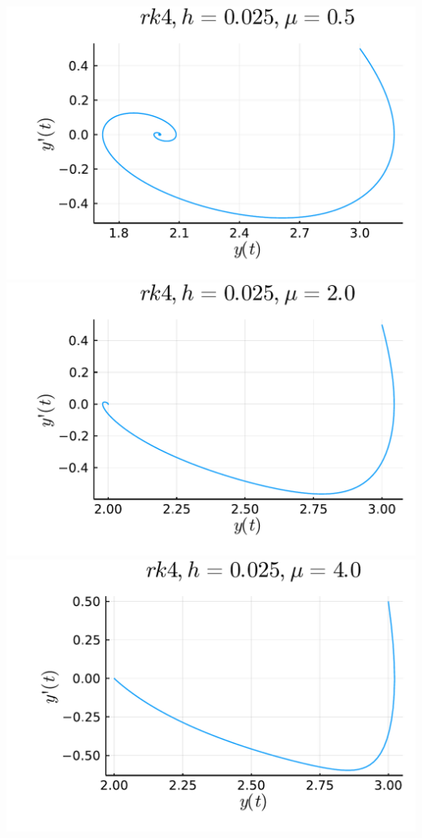 \documentclass[12pt,a4paper]{article}
\begin{document}
\includegraphics[width=\linewidth]{figures/ass_2_report_3_1.pdf}
\includegraphics[width=\linewidth]{figures/ass_2_report_3_2.pdf}
\includegraphics[width=\linewidth]{figures/ass_2_report_3_3.pdf}
\end{document}
